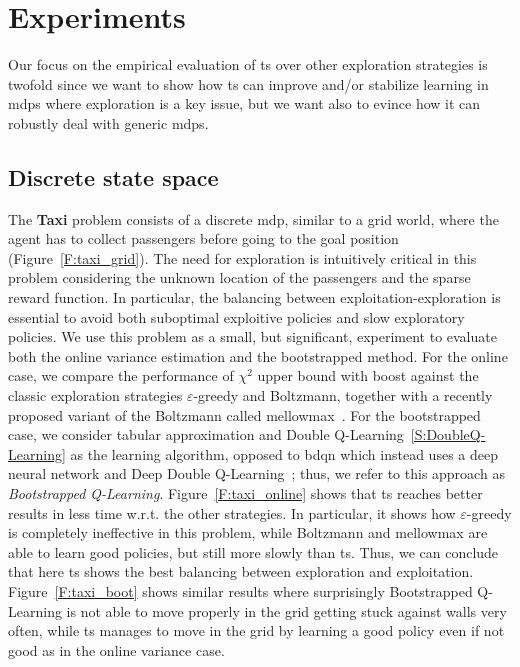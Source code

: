 \section{Experiments}
Our focus on the empirical evaluation of \gls{ts} over other exploration strategies is twofold since we want to show how \gls{ts} can improve and/or stabilize learning in \glspl{mdp} where exploration is a key issue, but we want also to evince how it can robustly deal with generic \glspl{mdp}.
\subsection{Discrete state space}
The \textbf{Taxi} problem consists of a discrete \gls{mdp}, similar to a grid world, where the agent has to collect passengers before going to the goal position~\cite{pmlr-v70-asadi17a} (Figure~\ref{F:taxi_grid}). The need for exploration is intuitively critical in this problem considering the unknown location of the passengers and the sparse reward function. In particular, the balancing between exploitation-exploration is essential to avoid both suboptimal exploitive policies and slow exploratory policies. We use this problem as a small, but significant, experiment to evaluate both the online variance estimation and the bootstrapped method. For the online case, we compare the performance of $\chi^2$ upper bound with boost against the classic exploration strategies $\varepsilon$-greedy and Boltzmann, together with a recently proposed variant of the Boltzmann called mellowmax~\cite{pmlr-v70-asadi17a}. For the bootstrapped case, we consider tabular approximation and Double Q-Learning~\ref{S:DoubleQ-Learning} as the learning algorithm, opposed to \gls{bdqn}  which instead uses a deep neural network and Deep Double Q-Learning~\cite{van2016deep}; thus, we refer to this approach as \textit{Bootstrapped Q-Learning}. Figure~\ref{F:taxi_online} shows that \gls{ts} reaches better results in less time w.r.t. the other strategies. In particular, it shows how $\varepsilon$-greedy is completely ineffective in this problem, while Boltzmann and mellowmax are able to learn good policies, but still more slowly than \gls{ts}. Thus, we can conclude that here \gls{ts} shows the best balancing between exploration and exploitation. Figure~\ref{F:taxi_boot} shows similar results where surprisingly Bootstrapped Q-Learning is not able to move properly in the grid getting stuck against walls very often, while \gls{ts} manages to move in the grid by learning a good policy even if not good as in the online variance case.

